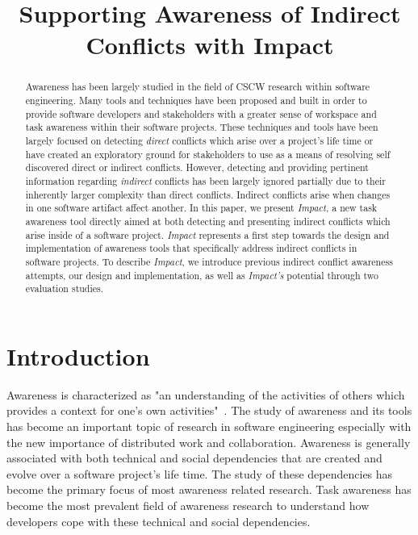 \documentclass[conference]{IEEEtran}
\begin{document}
\title{Supporting Awareness of Indirect Conflicts with Impact}

\author{
\and
{}
}

\maketitle

\begin{abstract}
Awareness has been largely studied in the field of CSCW research within
software engineering. Many tools and techniques have been proposed and built
in order to provide software developers and stakeholders with a greater
sense of workspace and task awareness within their software projects. These
techniques and tools have been largely focused on detecting \textit{direct} 
conflicts which arise over a project's life time or have created 
an exploratory ground for stakeholders to use as a means of resolving self
discovered direct or indirect conflicts. However, detecting 
and providing pertinent information regarding \textit{indirect} conflicts has been
largely ignored partially due to their inherently larger
complexity than direct conflicts. Indirect conflicts arise when changes
in one software artifact affect another. In this paper, we present
\textit{Impact}, a new task awareness tool directly aimed at both detecting
and presenting indirect conflicts which arise inside of a software project.
\textit{Impact} represents a first step towards the design and implementation
of awareness tools that specifically address indirect conflicts in software
projects. To describe \textit{Impact}, we introduce previous indirect 
conflict awareness attempts, our design 
and implementation, as well as \textit{Impact's} potential through
two evaluation studies. 
\end{abstract}


\section{Introduction}
Awareness is characterized as "an understanding of the activities of others
which provides a context for one's own activities"~\cite{Dourish:1992:ACS}.
The study of awareness and its tools has become an important topic of
research in software engineering especially with the new importance of
distributed work and collaboration. Awareness is generally associated with
both technical and social dependencies that are created and evolve over
a software project's life time. The study of these dependencies has become
the primary focus of most awareness related research. Task awareness has
become the most prevalent field of awareness research to understand 
how developers cope with these technical and social dependencies.
\end{document}
